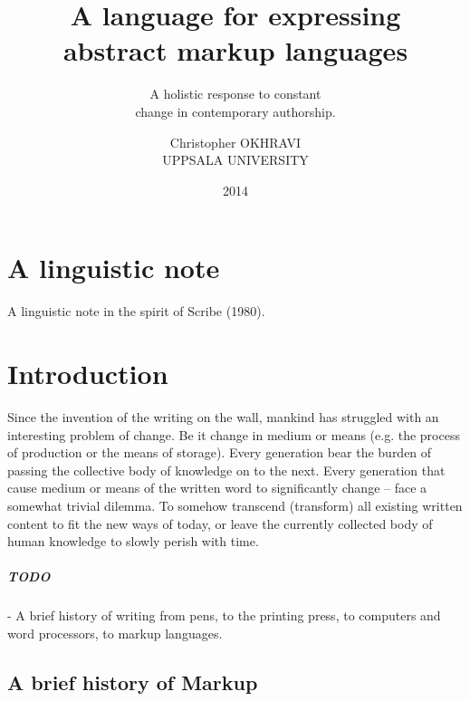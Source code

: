 \documentclass{scrreprt}
\date{2014}
\title{ A language for expressing \\ abstract markup languages }
\subtitle{A holistic response to constant \\ change in contemporary authorship.}
\author{ Christopher OKHRAVI \\ UPPSALA UNIVERSITY }
\begin{document}
\maketitle
\tableofcontents
\pagebreak





%
%
%
%
%
%
\chapter*{A linguistic note}
A linguistic note in the spirit of Scribe (1980).
 






%
%
%
%
%
%
\glsaddall
\printglossary






%
%
%
%
%
%

\chapter{Introduction}

Since the invention of the writing on the wall, mankind has struggled with an interesting problem of change. Be it change in medium or means (e.g. the process of production or the means of storage). Every generation bear the burden of passing the collective body of knowledge on to the next. Every generation that cause medium or means of the written word to significantly change --  face a somewhat trivial dilemma. To somehow transcend (transform) all existing written content to fit the new ways of today, or leave the currently collected body of human knowledge to slowly perish with time.

\paragraph{TODO}
- A brief history of writing from pens, to the printing press, to computers and word processors, to markup languages.
 


\section{A brief history of Markup}
\end{document}
